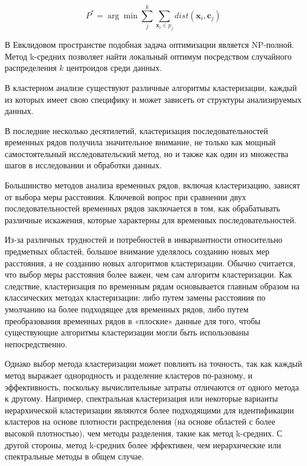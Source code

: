 \begin{equation} \label{clusters}
    P^* = \arg \min \sum_j^k \sum_{\textbf{x}_i \in p_j} dist(\textbf{x}_i, \textbf{c}_j)
\end{equation}

В Евклидовом пространстве подобная задача оптимизации является NP-полной.
Метод k-средних позволяет найти локальный оптимум посредством
случайного распределения $k$ центроидов среди данных.

В кластерном анализе существуют различные алгоритмы кластеризации,
каждый из которых имеет свою специфику и может зависеть
от структуры анализируемых данных.

В последние несколько десятилетий, кластеризация последовательностей временных рядов получила значительное внимание,
не только как мощный самостоятельный исследовательский метод,
но и также как один из множества шагов в исследовании и обработки данных.

Большинство методов анализа временных рядов, включая кластеризацию,
зависят от выбора меры расстояния. Ключевой вопрос при сравнении двух последовательностей 
временных рядов заключается в том, как обрабатывать различные искажения, 
которые характерны для временных последовательностей.

Из-за различных трудностей и потребностей в инвариантности относительно предметных областей,
большое внимание уделялось созданию новых мер расстояния, а не созданию новых алгоритмов кластеризации. 
Обычно считается, что выбор меры расстояния более важен, чем сам алгоритм кластеризации. 
Как следствие, кластеризация по временным рядам основывается главным образом на классических методах кластеризации: 
либо путем замены расстояния по умолчанию на более подходящее для временных рядов, 
либо путем преобразования временных рядов в «плоские» данные для того, чтобы существующие алгоритмы кластеризации 
могли быть использованы непосредственно.

Однако выбор метода кластеризации может повлиять
на точность, так как каждый метод выражает однородность и разделение кластеров по-разному, и эффективность, 
поскольку вычислительные затраты отличаются от одного метода к другому. Например, спектральная кластеризация 
или некоторые варианты иерархической кластеризации являются более подходящими для идентификации кластеров 
на основе плотности распределения (на основе областей с более высокой плотностью), 
чем методы разделения, такие как метод k-средних. С другой стороны, метод k-средних более эффективен,
чем иерархические или спектральные методы в общем случае. 

